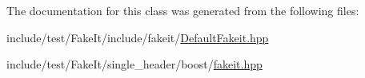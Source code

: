 The documentation for this class was generated from the following files\+:\begin{DoxyCompactItemize}
\item 
include/test/\+Fake\+It/include/fakeit/\mbox{\hyperlink{DefaultFakeit_8hpp}{Default\+Fakeit.\+hpp}}\item 
include/test/\+Fake\+It/single\+\_\+header/boost/\mbox{\hyperlink{single__header_2boost_2fakeit_8hpp}{fakeit.\+hpp}}\end{DoxyCompactItemize}
